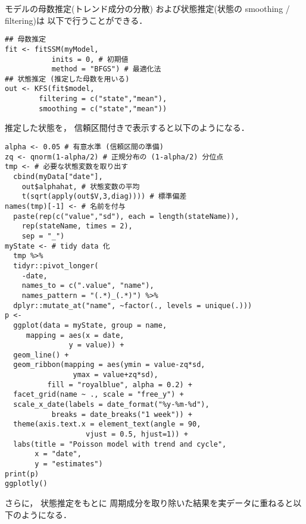 \documentclass[10pt,oneside,fleqn]{scrartcl}
\begin{document}
モデルの母数推定(トレンド成分の分散)
および状態推定(状態の smoothing / filtering)は
以下で行うことができる．

\begin{verbatim}
## 母数推定 
fit <- fitSSM(myModel, 
		   inits = 0, # 初期値
		   method = "BFGS") # 最適化法
## 状態推定 (推定した母数を用いる)
out <- KFS(fit$model,
		filtering = c("state","mean"),
		smoothing = c("state","mean"))
\end{verbatim}

推定した状態を，
信頼区間付きで表示すると以下のようになる．

\begin{figure}[htbp]
  \centering
  \myGraph[1]{}
\end{figure}

\begin{verbatim}
alpha <- 0.05 # 有意水準 (信頼区間の準備)
zq <- qnorm(1-alpha/2) # 正規分布の (1-alpha/2) 分位点
tmp <- # 必要な状態変数を取り出す
  cbind(myData["date"],
	out$alphahat, # 状態変数の平均
	t(sqrt(apply(out$V,3,diag)))) # 標準偏差
names(tmp)[-1] <- # 名前を付与
  paste(rep(c("value","sd"), each = length(stateName)),
	rep(stateName, times = 2),
	sep = "_")
myState <- # tidy data 化
  tmp %>% 
  tidyr::pivot_longer(
    -date,
    names_to = c(".value", "name"), 
    names_pattern = "(.*)_(.*)") %>%
  dplyr::mutate_at("name", ~factor(., levels = unique(.)))
p <- 
  ggplot(data = myState, group = name,
	 mapping = aes(x = date,
		       y = value)) +
  geom_line() +
  geom_ribbon(mapping = aes(ymin = value-zq*sd,
			    ymax = value+zq*sd),
	      fill = "royalblue", alpha = 0.2) +
  facet_grid(name ~ ., scale = "free_y") + 
  scale_x_date(labels = date_format("%y-%m-%d"), 
	       breaks = date_breaks("1 week")) + 
  theme(axis.text.x = element_text(angle = 90,
				   vjust = 0.5, hjust=1)) +
  labs(title = "Poisson model with trend and cycle",
       x = "date",
       y = "estimates")
print(p)
ggplotly()
\end{verbatim}

さらに，
状態推定をもとに
周期成分を取り除いた結果を実データに重ねると以下のようになる．

\begin{figure}[htbp]
  \centering
  \myGraph[1]{}
\end{figure}
\end{document}
